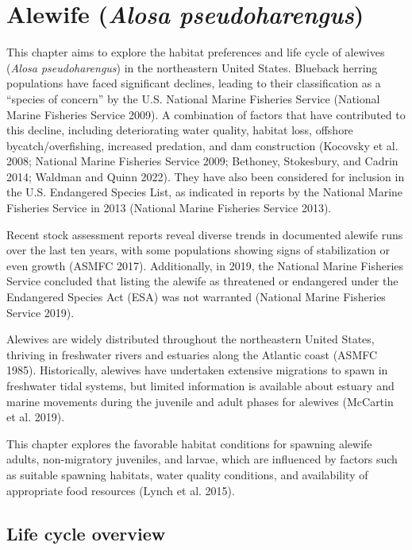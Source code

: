 \documentclass[
]{book}
\begin{document}
\hypertarget{alewife-alosa-pseudoharengus}{%
\chapter{\texorpdfstring{Alewife (\emph{Alosa pseudoharengus})}{Alewife (Alosa pseudoharengus)}}\label{alewife-alosa-pseudoharengus}}

This chapter aims to explore the habitat preferences and life cycle of alewives (\emph{Alosa pseudoharengus}) in the northeastern United States.
Blueback herring populations have faced significant declines, leading to their classification as a ``species of concern'' by the U.S.
National Marine Fisheries Service (National Marine Fisheries Service 2009).
A combination of factors that have contributed to this decline, including deteriorating water quality, habitat loss, offshore bycatch/overfishing, increased predation, and dam construction (Kocovsky et al. 2008; National Marine Fisheries Service 2009; Bethoney, Stokesbury, and Cadrin 2014; Waldman and Quinn 2022).
They have also been considered for inclusion in the U.S.
Endangered Species List, as indicated in reports by the National Marine Fisheries Service in 2013 (National Marine Fisheries Service 2013).

Recent stock assessment reports reveal diverse trends in documented alewife runs over the last ten years, with some populations showing signs of stabilization or even growth (ASMFC 2017).
Additionally, in 2019, the National Marine Fisheries Service concluded that listing the alewife as threatened or endangered under the Endangered Species Act (ESA) was not warranted (National Marine Fisheries Service 2019).

Alewives are widely distributed throughout the northeastern United States, thriving in freshwater rivers and estuaries along the Atlantic coast (ASMFC 1985).
Historically, alewives have undertaken extensive migrations to spawn in freshwater tidal systems, but limited information is available about estuary and marine movements during the juvenile and adult phases for alewives (McCartin et al. 2019).

This chapter explores the favorable habitat conditions for spawning alewife adults, non-migratory juveniles, and larvae, which are influenced by factors such as suitable spawning habitats, water quality conditions, and availability of appropriate food resources (Lynch et al. 2015).

\hypertarget{life-cycle-overview}{%
\section{Life cycle overview}\label{life-cycle-overview}}
\end{document}
